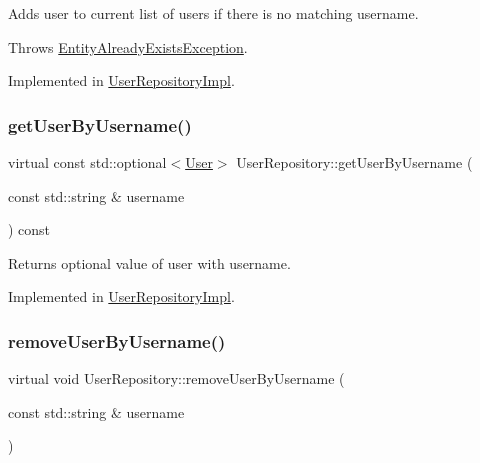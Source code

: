 Adds user to current list of users if there is no matching username.

Throws \hyperlink{structEntityAlreadyExistsException}{Entity\+Already\+Exists\+Exception}. 

Implemented in \hyperlink{classUserRepositoryImpl_a61a12165d5160621002184655ab1a809}{User\+Repository\+Impl}.

\mbox{\label{classUserRepository_aeb49a2995f19e516e9d068cb082a9535}} 
\subsubsection{\texorpdfstring{get\+User\+By\+Username()}{getUserByUsername()}}
{\footnotesize\ttfamily virtual const std\+::optional$<$\hyperlink{classUser}{User}$>$ User\+Repository\+::get\+User\+By\+Username (\begin{DoxyParamCaption}\item[{const std\+::string \&}]{username }\end{DoxyParamCaption}) const\hspace{0.3cm}{\ttfamily [pure virtual]}}

Returns optional value of user with username. 

Implemented in \hyperlink{classUserRepositoryImpl_a4da14e2e63ff2971a81ab980994eb585}{User\+Repository\+Impl}.

\mbox{\label{classUserRepository_a32dbae2d045588d858b8f21550987577}} 
\subsubsection{\texorpdfstring{remove\+User\+By\+Username()}{removeUserByUsername()}}
{\footnotesize\ttfamily virtual void User\+Repository\+::remove\+User\+By\+Username (\begin{DoxyParamCaption}\item[{const std\+::string \&}]{username }\end{DoxyParamCaption})\hspace{0.3cm}{\ttfamily [pure virtual]}}

